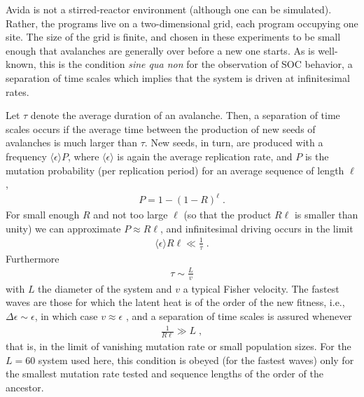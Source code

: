 \documentclass[letterpaper]{article}
\begin{document}
Avida is not a stirred-reactor environment (although one can be
simulated). Rather, the programs live on a two-dimensional grid, each
program occupying one site. The size of the grid is finite, and chosen
in these experiments to be small enough that avalanches are generally
over before a new one starts. As is well-known, this is the condition
{\em sine qua non} for the observation of SOC behavior, a separation
of time scales which implies that the system is driven at
infinitesimal rates.

Let $\tau$ denote the average duration of an avalanche. Then, a
separation of time scales occurs if the average time between the
production of new seeds of avalanches is much larger than $\tau$. New
seeds, in turn, are produced with a frequency $\langle\epsilon\rangle
P$, where $\langle\epsilon\rangle$ is again the average replication
rate, and $P$ is the mutation probability (per replication period) for
an average sequence of length $\ell$,
\begin{eqnarray}
P=1-(1-R)^\ell\;.
\end{eqnarray}
For small enough $R$ and not too large $\ell$ (so that the product
$R\ell$ is smaller than unity) we can approximate
$P\approx R\ell$, and infinitesimal driving occurs in the limit
\begin{eqnarray}
\langle \epsilon\rangle R\ell \ll\frac1\tau\;.\label{cond}
\end{eqnarray}
Furthermore
\begin{eqnarray}
\tau\sim\frac{L}v
\end{eqnarray}
with $L$ the diameter of the system and $v$ a typical Fisher velocity.
The fastest waves are those for which the latent heat is of the order
of the new fitness, i.e., $\Delta\epsilon\sim\epsilon$, in which case
$v\approx \epsilon$ \citep[because $D\sim\epsilon$ in
Eq.~(\ref{eq4}),][]{CHU}, and a separation of time scales is assured
whenever
\begin{eqnarray}
\frac1{R\ell}\gg {L}\;,
\end{eqnarray}
that is, in the limit of vanishing mutation rate or small population
sizes. For the $L=60$ system used here, this condition is obeyed (for
the fastest waves) only for the smallest mutation rate tested and
sequence lengths of the order of the ancestor.
\end{document}

